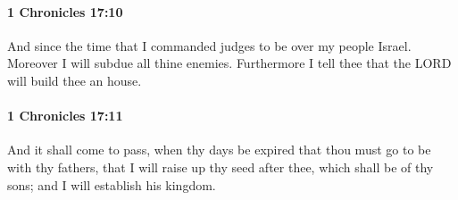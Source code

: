 		\paragraph{1 Chronicles 17:10} %
			\label{1CHRONICLES-17-10}

			And since the time that I commanded judges to be over my people Israel. Moreover I will subdue all thine enemies. Furthermore I tell thee that the LORD will build thee an house.


		\paragraph{1 Chronicles 17:11} %
			\label{1CHRONICLES-17-11}

			And it shall come to pass, when thy days be expired that thou must go to be with thy fathers, that I will raise up thy seed after thee, which shall be of thy sons; and I will establish his kingdom.

